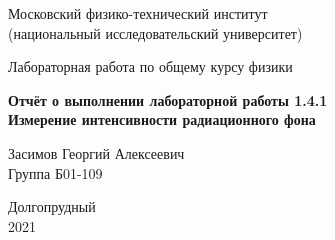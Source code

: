 

\usepackage[T2A]{fontenc}                        %
\usepackage[utf8]{inputenc}                        %
\usepackage[english,russian]{babel}        %
\usepackage{tikz}
\usepackage{pgfplots}




\usepackage{amsmath,amsfonts,amssymb,amsthm,mathtools} 




\usepackage{wasysym}




\begin{titlepage}

    \newpage
    \begin{center}
        \normalsize Московский физико-технический институт \\(национальный исследовательский университет)
    \end{center}

    \vspace{6em}

    \begin{center}
        \Large Лабораторная работа по общему курсу физики\\
    \end{center}

    \vspace{1em}

    \begin{center}
        \Large \textbf{Отчёт о выполнении лабораторной работы 1.4.1\\ {Измерение интенсивности радиационного фона}}
    \end{center}

    \vspace{2em}

    \begin{center}
        \large Засимов Георгий Алексеевич \\
        Группа Б01-109
    \end{center}

    \vspace{\fill}

    \begin{center}
    Долгопрудный \\2021
    \end{center}
    
\end{titlepage}


